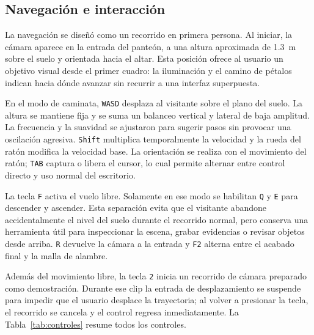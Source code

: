 \documentclass[letter,12pt]{article}
\begin{document}
	\subsection{Navegación e interacción}
	La navegación se diseñó como un recorrido en primera persona. Al iniciar, la cámara aparece en la entrada del panteón, a una altura aproximada de 1.3~m sobre el suelo y orientada hacia el altar. Esta posición ofrece al usuario un objetivo visual desde el primer cuadro: la iluminación y el camino de pétalos indican hacia dónde avanzar sin recurrir a una interfaz superpuesta.

	En el modo de caminata, \texttt{WASD} desplaza al visitante sobre el plano del suelo. La altura se mantiene fija y se suma un balanceo vertical y lateral de baja amplitud. La frecuencia y la suavidad se ajustaron para sugerir pasos sin provocar una oscilación agresiva. \texttt{Shift} multiplica temporalmente la velocidad y la rueda del ratón modifica la velocidad base. La orientación se realiza con el movimiento del ratón; \texttt{TAB} captura o libera el cursor, lo cual permite alternar entre control directo y uso normal del escritorio.

	La tecla \texttt{F} activa el vuelo libre. Solamente en ese modo se habilitan \texttt{Q} y \texttt{E} para descender y ascender. Esta separación evita que el visitante abandone accidentalmente el nivel del suelo durante el recorrido normal, pero conserva una herramienta útil para inspeccionar la escena, grabar evidencias o revisar objetos desde arriba. \texttt{R} devuelve la cámara a la entrada y \texttt{F2} alterna entre el acabado final y la malla de alambre.

	Además del movimiento libre, la tecla \texttt{2} inicia un recorrido de cámara preparado como demostración. Durante ese clip la entrada de desplazamiento se suspende para impedir que el usuario desplace la trayectoria; al volver a presionar la tecla, el recorrido se cancela y el control regresa inmediatamente. La Tabla~\ref{tab:controles} resume todos los controles.
\end{document}
